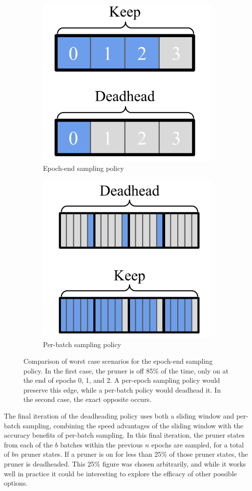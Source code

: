 \begin{figure}[ht!]
\centering
\begin{subfigure}{.5\textwidth}
  \centering
  \includegraphics[width=.6\linewidth]{dh/epoch}
  \caption{Epoch-end sampling policy}
\end{subfigure}%
\begin{subfigure}{.5\textwidth}
  \centering
  \includegraphics[width=.6\linewidth]{dh/batch}
  \caption{Per-batch sampling policy}
\end{subfigure}
\caption[Comparison of worst-cast scenarios of epoch-end sampling policy]{Comparison of worst case scenarios for the epoch-end sampling policy. In the first case, the pruner is off 85\%
of the time, only on at the end of epochs 0, 1, and 2. A per-epoch sampling policy would preserve this edge, while a
per-batch policy would deadhead it. In the second case, the exact opposite occurs.}
\label{fig:dhbatch}
\end{figure}

 The final iteration of the deadheading policy uses both a sliding window and per-batch sampling, combining the speed
advantages of the sliding window with the accuracy benefits of per-batch sampling. In this final iteration, the pruner
states from each of the $b$ batches within the previous $n$ epochs are sampled, for a total of $bn$ pruner states. If a
pruner is on for less than 25\% of those pruner states, the pruner is deadheaded. This 25\% figure was chosen arbitrarily,
and while it works well in practice it could be interesting to explore the efficacy of other possible options.

